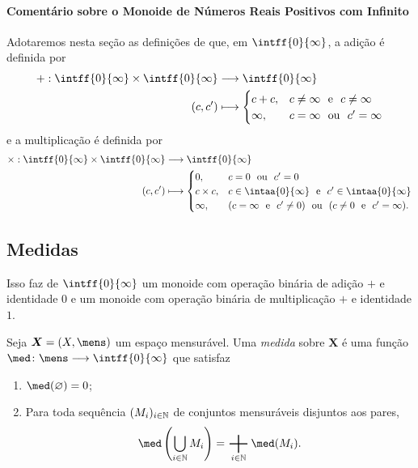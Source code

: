 \paragraph{Comentário sobre o Monoide de Números Reais Positivos com Infinito}

Adotaremos nesta seção as definições de que, em $\intff{0}{\infty}$, a adição é definida por
	\begin{align*}
	\func{+}{\intff{0}{\infty} \times \intff{0}{\infty}}{\intff{0}{\infty}}{(c,c')}{
		\begin{cases}
			c+c,& c \neq \infty \e c \neq \infty \\
			\infty,& c=\infty \ou c'=\infty
		\end{cases}
	}
	\end{align*}
e a multiplicação é definida por
	\begin{align*}
	\func{\times}{\intff{0}{\infty} \times \intff{0}{\infty}}{\intff{0}{\infty}}{(c,c')}{
		\begin{cases}
			0,& c=0 \ou c'=0 \\
			c \times c,& c \in \intaa{0}{\infty} \e c' \in \intaa{0}{\infty} \\
			\infty,& (c=\infty \e c' \neq 0) \ou (c \neq 0 \e c'=\infty).
		\end{cases}
	}
	\end{align*}

\subsection{Medidas}

Isso faz de $\intff{0}{\infty}$ um monoide com operação binária de adição $+$ e identidade $0$ e um monoide com operação binária de multiplicação $+$ e identidade $1$.

\begin{defi}
Seja $\bm X=(X,\mens)$ um espaço mensurável. Uma \emph{medida} sobre $\bm X$ é uma função $\med\colon \mens \to \intff{0}{\infty}$ que satisfaz
	\begin{enumerate}
	\item $\med(\emptyset)=0$;
	\item Para toda sequência $(M_i)_{i \in \mathbb{N}}$ de conjuntos mensuráveis disjuntos aos pares,
	\begin{equation*}
	\med\left(\bigcup_{i \in \N} M_i\right)=\sum_{i \in \N} \med(M_i).
	\end{equation*}
	\end{enumerate}
\end{defi}

